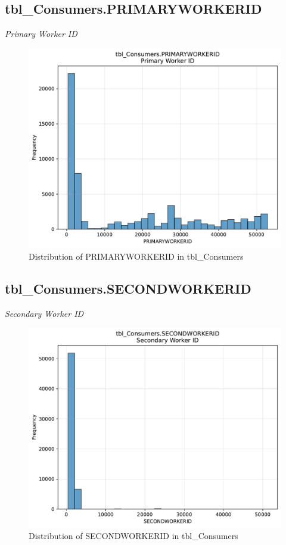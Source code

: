 \subsection{tbl\_Consumers.PRIMARYWORKERID}
\textit{Primary Worker ID}

\begin{figure}[htbp]
\centering
\includegraphics[width=\textwidth]{figures/dbo_tbl_Consumers_PRIMARYWORKERID.pdf}
\caption{Distribution of PRIMARYWORKERID in tbl\_Consumers}
\end{figure}\newpage

\subsection{tbl\_Consumers.SECONDWORKERID}
\textit{Secondary Worker ID}

\begin{figure}[htbp]
\centering
\includegraphics[width=\textwidth]{figures/dbo_tbl_Consumers_SECONDWORKERID.pdf}
\caption{Distribution of SECONDWORKERID in tbl\_Consumers}
\end{figure}\newpage

